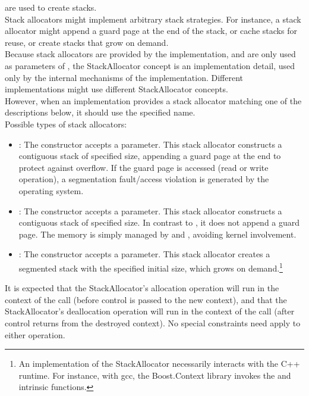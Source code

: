 \label{subsec:stackalloc}
are used to create stacks.\\
Stack allocators might implement arbitrary stack strategies. For instance, a
stack allocator might append a guard page at the end of the stack, or cache
stacks for reuse, or create stacks that grow on demand.\\
Because stack allocators are provided by the implementation, and are only used
as parameters of \callcc, the StackAllocator concept is an implementation detail,
used only by the internal mechanisms of the \cc implementation. Different
implementations might use different StackAllocator concepts.\\
However, when an implementation provides a stack allocator matching one of
the descriptions below, it should use the specified name.\\
Possible types of stack allocators:
\begin{itemize}
    \item {}: The constructor accepts a 
        parameter. This stack allocator constructs a contiguous stack of
        specified size, appending a guard page at the end to protect against
        overflow. If the guard page is accessed (read or write operation), a
        segmentation fault/access violation is generated by the operating
        system.
    \item {}: The constructor accepts a  parameter.
        This stack allocator constructs a contiguous stack of specified size.
        In contrast to , it does not append a guard
        page. The memory is simply managed by 
        and , avoiding kernel involvement.
    \item {}: The constructor accepts a  parameter.
        This stack allocator creates a segmented stack with the specified
        initial size, which grows on demand.\footnote{An implementation of
        the  StackAllocator necessarily interacts with the C++
        runtime. For instance, with gcc, the Boost.Context\cite{bcontext} library
        invokes the 
        and  intrinsic
        functions.\cite{splitalloc}\citecomma\cite{bctxseg}}
\end{itemize}

It is expected that the StackAllocator's allocation operation will run in the
context of the \callcc call (before control is passed to the new context), and
that the StackAllocator's deallocation operation will run in the context of
the \dtor call (after control returns from the destroyed
context). No special constraints need apply to either operation.
